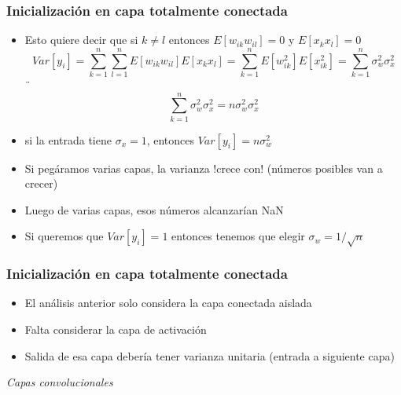 \documentclass[svgnames,12pt,aspectratio=149]{beamer}
\begin{document}
\begin{frame}
  \frametitle{Inicialización en capa totalmente conectada}

\begin{itemize}
\item Esto quiere decir que si $k\neq l$ entonces $E \left[w_{ik}w_{il}\right]=0 $ y $E \left[x_{k}x_{l}\right]=0$
\begin{equation*}
Var\left[ y_{i} \right] = \sum_{k=1}^{n}\sum_{l=1}^{n} E \left[w_{ik}w_{il}\right]E \left[x_{k}x_{l}\right]= \sum_{k=1}^{n}E \left[w_{ik}^2\right]E \left[x_{ik}^2\right]= \sum_{k=1}^{n}\sigma_{w}^2 \sigma_{x}^2
\end{equation*}¨
\begin{equation*}
 \sum_{k=1}^{n}\sigma_{w}^2 \sigma_{x}^2= n\sigma_{w}^2 \sigma_{x}^2
\end{equation*}
\item si la entrada tiene $\sigma_x=1$, entonces $Var[y_i]=n\sigma_{w}^2$
\item Si pegáramos varias capas, la varianza !crece con! (números posibles van a crecer)
\item Luego de varias capas, esos números alcanzarían NaN
\item Si queremos que $Var[y_i]=1$ entonces tenemos que elegir $\sigma_w=1/\sqrt{n}$ 
\end{itemize}
\end{frame}

\begin{frame}
  \frametitle{Inicialización en capa totalmente conectada}

\begin{itemize}

\item El análisis anterior solo considera la capa conectada aislada 
\item Falta considerar la capa de activación
\item Salida de esa capa debería tener varianza unitaria (entrada a siguiente capa)
\end{itemize}
\end{frame}

\begin{frame}
  \centering \LARGE
  \emph{Capas convolucionales}
\end{frame}

\end{document}
